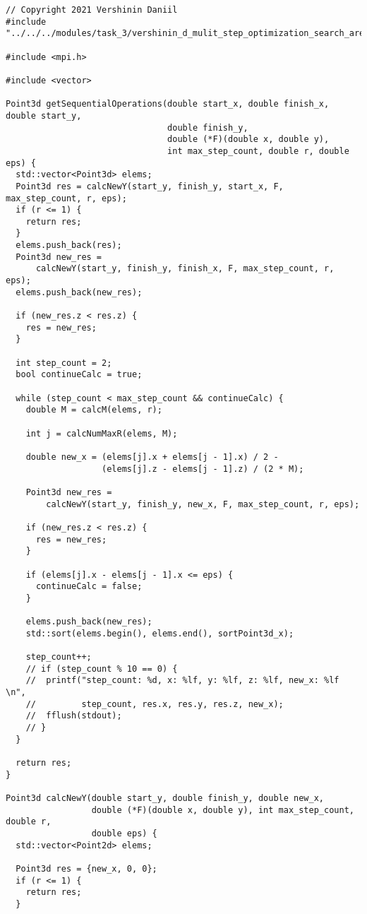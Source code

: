 \documentclass{report}
\begin{document}
\begin{lstlisting}
// Copyright 2021 Vershinin Daniil
#include "../../../modules/task_3/vershinin_d_mulit_step_optimization_search_area/mulit_step_optimization_search_area.h"

#include <mpi.h>

#include <vector>

Point3d getSequentialOperations(double start_x, double finish_x, double start_y,
                                double finish_y,
                                double (*F)(double x, double y),
                                int max_step_count, double r, double eps) {
  std::vector<Point3d> elems;
  Point3d res = calcNewY(start_y, finish_y, start_x, F, max_step_count, r, eps);
  if (r <= 1) {
    return res;
  }
  elems.push_back(res);
  Point3d new_res =
      calcNewY(start_y, finish_y, finish_x, F, max_step_count, r, eps);
  elems.push_back(new_res);

  if (new_res.z < res.z) {
    res = new_res;
  }

  int step_count = 2;
  bool continueCalc = true;

  while (step_count < max_step_count && continueCalc) {
    double M = calcM(elems, r);

    int j = calcNumMaxR(elems, M);

    double new_x = (elems[j].x + elems[j - 1].x) / 2 -
                   (elems[j].z - elems[j - 1].z) / (2 * M);

    Point3d new_res =
        calcNewY(start_y, finish_y, new_x, F, max_step_count, r, eps);

    if (new_res.z < res.z) {
      res = new_res;
    }

    if (elems[j].x - elems[j - 1].x <= eps) {
      continueCalc = false;
    }

    elems.push_back(new_res);
    std::sort(elems.begin(), elems.end(), sortPoint3d_x);

    step_count++;
    // if (step_count % 10 == 0) {
    //  printf("step_count: %d, x: %lf, y: %lf, z: %lf, new_x: %lf \n",
    //         step_count, res.x, res.y, res.z, new_x);
    //  fflush(stdout);
    // }
  }

  return res;
}

Point3d calcNewY(double start_y, double finish_y, double new_x,
                 double (*F)(double x, double y), int max_step_count, double r,
                 double eps) {
  std::vector<Point2d> elems;

  Point3d res = {new_x, 0, 0};
  if (r <= 1) {
    return res;
  }


\end{lstlisting}
\end{document}

